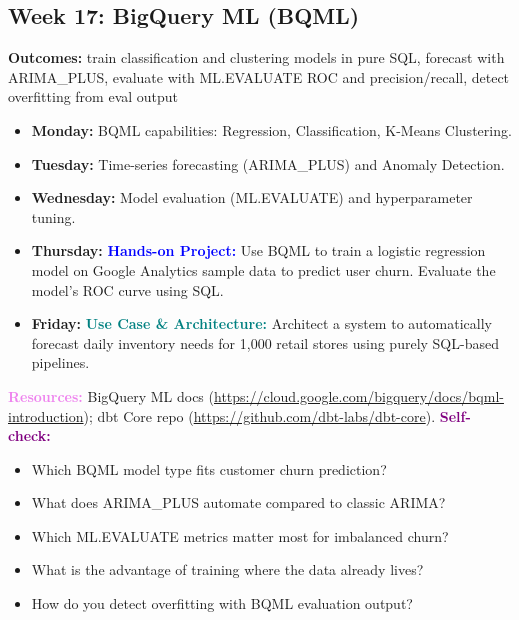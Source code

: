 \documentclass[11pt, a4paper]{article}
\newcommand{\project}[1]{\vspace{1mm}\noindent\textbf{\textcolor{blue}{Hands-on Project:}} #1}
\newcommand{\usecase}[1]{\vspace{1mm}\noindent\textbf{\textcolor{teal}{Use Case \& Architecture:}} #1}
\newcommand{\dayitem}[2]{\item \textbf{#1:} #2}
\newcommand{\resources}[1]{\vspace{1mm}\noindent\textbf{\textcolor{violet}{Resources:}} #1}
\newcommand{\selfcheck}[1]{\vspace{1mm}\noindent\textbf{\textcolor{purple}{Self-check:}} #1}
\begin{document}
\subsection*{Week 17: BigQuery ML (BQML)}
\par\noindent\textbf{Outcomes:} train classification and clustering models in pure SQL, forecast with ARIMA\_PLUS, evaluate with ML.EVALUATE ROC and precision/recall, detect overfitting from eval output
\begin{itemize}[label=-]
    \dayitem{Monday}{BQML capabilities: Regression, Classification, K-Means Clustering.}
    \dayitem{Tuesday}{Time-series forecasting (ARIMA\_PLUS) and Anomaly Detection.}
    \dayitem{Wednesday}{Model evaluation (ML.EVALUATE) and hyperparameter tuning.}
    \dayitem{Thursday}{\project{Use BQML to train a logistic regression model on Google Analytics sample data to predict user churn. Evaluate the model's ROC curve using SQL.}}
    \dayitem{Friday}{\usecase{Architect a system to automatically forecast daily inventory needs for 1,000 retail stores using purely SQL-based pipelines.}}
\end{itemize}
\resources{BigQuery ML docs (\url{https://cloud.google.com/bigquery/docs/bqml-introduction}); dbt Core repo (\url{https://github.com/dbt-labs/dbt-core}).}
\selfcheck{\begin{itemize}[label=-, nosep, leftmargin=1.5em]
    \item Which BQML model type fits customer churn prediction?
    \item What does ARIMA\_PLUS automate compared to classic ARIMA?
    \item Which ML.EVALUATE metrics matter most for imbalanced churn?
    \item What is the advantage of training where the data already lives?
    \item How do you detect overfitting with BQML evaluation output?
\end{itemize}}
\end{document}
